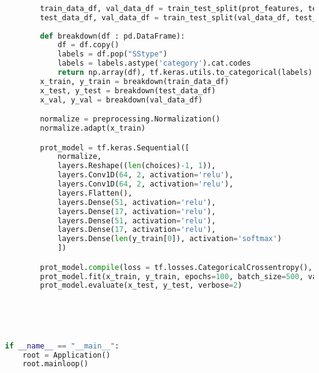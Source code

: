 \documentclass[12pt,letterpaper,oneside,reqno]{book}
\theoremstyle{plain}
\theoremstyle{definition}
\theoremstyle{plain}
\theoremstyle{remark}
\theoremstyle{plain}
\theoremstyle{definition}
\theoremstyle{plain}
\begin{document}
\begin{appendices}
\begin{lstlisting}[language=Python, label=lst:guifull, frame=single]
       
        train_data_df, val_data_df = train_test_split(prot_features, test_size=0.2)
        test_data_df, val_data_df = train_test_split(val_data_df, test_size=0.5)
        
        def breakdown(df : pd.DataFrame):
            df = df.copy()
            labels = df.pop("SStype")
            labels = labels.astype('category').cat.codes 
            return np.array(df), tf.keras.utils.to_categorical(labels)
        x_train, y_train = breakdown(train_data_df)
        x_test, y_test = breakdown(test_data_df)
        x_val, y_val = breakdown(val_data_df)

        normalize = preprocessing.Normalization()
        normalize.adapt(x_train)

        prot_model = tf.keras.Sequential([
            normalize,
            layers.Reshape((len(choices)-1, 1)),
            layers.Conv1D(64, 2, activation='relu'),
            layers.Conv1D(64, 2, activation='relu'),
            layers.Flatten(),
            layers.Dense(51, activation='relu'),
            layers.Dense(17, activation='relu'),
            layers.Dense(51, activation='relu'),
            layers.Dense(17, activation='relu'),
            layers.Dense(len(y_train[0]), activation='softmax')
            ])

        prot_model.compile(loss = tf.losses.CategoricalCrossentropy(), optimizer=tf.optimizers.Adam(), metrics=['categorical_accuracy'])
        prot_model.fit(x_train, y_train, epochs=100, batch_size=500, validation_data=(x_val, y_val), callbacks = [tf.keras.callbacks.EarlyStopping(patience = 4)])
        prot_model.evaluate(x_test, y_test, verbose=2)





if __name__ == "__main__":
    root = Application()
    root.mainloop()
\end{lstlisting}
\end{appendices}

\backmatter


\cleardoublepage
{}
\printbibliography
\end{document}
